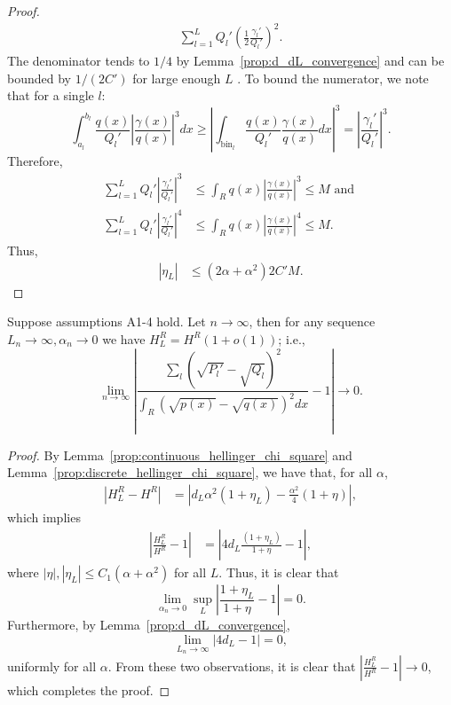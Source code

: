 \documentclass{article}
\newcommand{\bin}{\text{bin}}
\begin{document}
\begin{proof}
\begin{align*}
          { \sum_{l=1}^L Q_l' \left( \frac{1}{2} \frac{\gamma_l'}{Q_l'} \right)^2 }.
\end{align*}
The denominator tends to $1/4$ by Lemma~\ref{prop:d_dL_convergence} and can be bounded by $1/(2C')$ for large enough $L$ . To bound the numerator, we note that for a single $l$:
\[
\int_{a_l}^{b_l} \frac{q(x)}{Q_l'} \left| \frac{\gamma(x)}{q(x)} \right|^3 dx \geq
 \left| \int_{\bin_l} \frac{q(x)}{Q_l'} \frac{\gamma(x)}{q(x)} dx \right|^3 =
 \left| \frac{\gamma_l'}{Q_l'} \right|^3.
\]
Therefore,
\begin{align*}
\sum_{l=1}^L Q_l' \left| \frac{\gamma_l'}{Q_l'} \right|^3 &\leq \int_R q(x) \left| \frac{\gamma(x)}{q(x)} \right|^3 \leq M  \text{ and }\\
\sum_{l=1}^L Q_l' \left| \frac{\gamma_l'}{Q_l'} \right|^4 &\leq \int_R q(x) \left| \frac{\gamma(x)}{q(x)} \right|^4 \leq M.
\end{align*}
Thus, 
\begin{align*}
|\eta_L| &\leq (2 \alpha + \alpha^2) 2 C' M.
\end{align*}
\end{proof}






\begin{lemma}
\label{prop:H_HL_convergence_R}
Suppose assumptions A1-4 hold. Let $n \rightarrow \infty$, then for any sequence $L_n \rightarrow \infty, \alpha_n \rightarrow 0$ we have $H^R_L = H^R(1+o(1))$; i.e.,
\[
\lim_{n \rightarrow \infty} \left| \frac{\sum_l (\sqrt{P_l'} - \sqrt{Q_l})^2}{\int_R (\sqrt{p(x)} - \sqrt{q(x)})^2 dx} 
        - 1 \right| \rightarrow 0.
\]

\end{lemma}

\begin{proof}
By Lemma~\ref{prop:continuous_hellinger_chi_square} and Lemma~\ref{prop:discrete_hellinger_chi_square}, we have that, for all $\alpha$,
\begin{align*}
| H^R_L - H^R | & = \left| d_L \alpha^2 ( 1 + \eta_L) -  \frac{\alpha^2}{4} ( 1 + \eta) \right|,
 \end{align*}
which implies
\begin{align*}
\left| \frac{H^R_L}{H^R} - 1 \right| &= \left |4d_L \frac{(1+\eta_L)}{1 + \eta} - 1 \right|,
\end{align*}
where $|\eta|, |\eta_L| \leq C_1(\alpha + \alpha^2)$ for all $L$. Thus, it is clear that
\[
\lim_{\alpha_n \rightarrow 0} \sup_L \left| \frac{1+\eta_L}{1+\eta} - 1 \right| = 0.
\]
Furthermore, by Lemma~\ref{prop:d_dL_convergence},
\[
\lim_{L_n \rightarrow \infty} \left| 4d_L - 1 \right| = 0,
\]
uniformly for all $\alpha$. From these two observations, it is clear that $\left| \frac{H^R_L}{H^R} - 1 \right| \to 0$, which completes the proof.
\end{proof}
\end{document}
